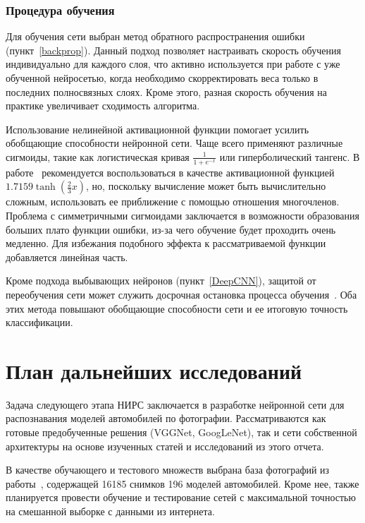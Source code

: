 \documentclass[a4paper,14pt]{extarticle} %
\begin{document}
\subsubsection{Процедура обучения}
\hspace{\parindent} Для обучения сети выбран метод обратного распространения ошибки (пункт~\ref{backprop}). Данный подход позволяет настраивать скорость обучения индивидуально для каждого слоя, что активно используется при работе с уже обученной нейросетью, когда необходимо скорректировать веса только в последних полносвязных слоях. Кроме этого, разная скорость обучения на практике увеличивает сходимость алгоритма.

Использование нелинейной активационной функции помогает усилить обобщающие способности нейронной сети. Чаще всего применяют различные сигмоиды, такие как логистическая кривая $\frac{1}{1+e^{-x}}$ или гиперболический тангенс. В работе~\cite{networkdesign} рекомендуется воспользоваться в качестве активационной функцией $1.7159\tanh(\frac{2}{3}x)$, но, поскольку вычисление может быть вычислительно сложным, использовать ее приближение с помощью отношения многочленов. Проблема с симметричными сигмоидами заключается в возможности образования больших плато функции ошибки, из-за чего обучение будет проходить очень медленно. Для избежания подобного эффекта к рассматриваемой функции добавляется линейная часть.

Кроме подхода выбывающих нейронов (пункт~\ref{DeepCNN}), защитой от переобучения сети может служить досрочная остановка процесса обучения~\cite{EarlyStopping}. Оба этих метода повышают обобщающие способности сети и ее итоговую точность классификации.

\section{План дальнейших исследований}
\hspace{\parindent} Задача следующего этапа НИРС заключается в разработке нейронной сети для распознавания моделей автомобилей по фотографии. Рассматриваются как готовые предобученные решения (VGGNet, GoogLeNet), так и сети собственной архитектуры на основе изученных статей и исследований из этого отчета.

В качестве обучающего и тестового множеств выбрана база фотографий из работы~\cite{CarsDataset}, содержащей 16185 снимков 196 моделей автомобилей. Кроме нее, также планируется провести обучение и тестирование сетей с максимальной точностью на смешанной выборке с данными из интернета. 
\end{document}
